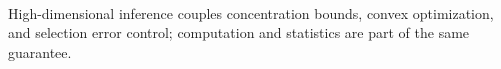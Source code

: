 \begin{remark} \label{rem:high-dimensional-cross-reference-optimization} \\
High-dimensional inference couples concentration bounds, convex optimization, and selection error control; computation and statistics are part of the same guarantee.
\end{remark}
